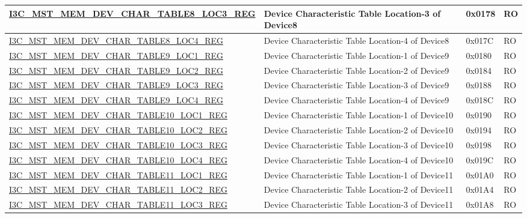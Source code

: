 \begin{longtable}{ | p{8cm} | p{5.5cm} | p{1.3cm} | p{1cm} | }
\hyperref[regdesc:I3CMSTMEMDEVCHARTABLENLOCMREG]{I3C\_MST\_MEM\_DEV\_CHAR\_TABLE8\_LOC3\_REG} & Device Characteristic Table Location-3 of Device8 & 0x0178 & RO \\ \hline
\hyperref[regdesc:I3CMSTMEMDEVCHARTABLENLOCMREG]{I3C\_MST\_MEM\_DEV\_CHAR\_TABLE8\_LOC4\_REG} & Device Characteristic Table Location-4 of Device8 & 0x017C & RO \\ \hline
\hyperref[regdesc:I3CMSTMEMDEVCHARTABLENLOCMREG]{I3C\_MST\_MEM\_DEV\_CHAR\_TABLE9\_LOC1\_REG} & Device Characteristic Table Location-1 of Device9 & 0x0180 & RO \\ \hline
\hyperref[regdesc:I3CMSTMEMDEVCHARTABLENLOCMREG]{I3C\_MST\_MEM\_DEV\_CHAR\_TABLE9\_LOC2\_REG} & Device Characteristic Table Location-2 of Device9 & 0x0184 & RO \\ \hline
\hyperref[regdesc:I3CMSTMEMDEVCHARTABLENLOCMREG]{I3C\_MST\_MEM\_DEV\_CHAR\_TABLE9\_LOC3\_REG} & Device Characteristic Table Location-3 of Device9 & 0x0188 & RO \\ \hline
\hyperref[regdesc:I3CMSTMEMDEVCHARTABLENLOCMREG]{I3C\_MST\_MEM\_DEV\_CHAR\_TABLE9\_LOC4\_REG} & Device Characteristic Table Location-4 of Device9 & 0x018C & RO \\ \hline
\hyperref[regdesc:I3CMSTMEMDEVCHARTABLENLOCMREG]{I3C\_MST\_MEM\_DEV\_CHAR\_TABLE10\_LOC1\_REG} & Device Characteristic Table Location-1 of Device10 & 0x0190 & RO \\ \hline
\hyperref[regdesc:I3CMSTMEMDEVCHARTABLENLOCMREG]{I3C\_MST\_MEM\_DEV\_CHAR\_TABLE10\_LOC2\_REG} & Device Characteristic Table Location-2 of Device10 & 0x0194 & RO \\ \hline
\hyperref[regdesc:I3CMSTMEMDEVCHARTABLENLOCMREG]{I3C\_MST\_MEM\_DEV\_CHAR\_TABLE10\_LOC3\_REG} & Device Characteristic Table Location-3 of Device10 & 0x0198 & RO \\ \hline
\hyperref[regdesc:I3CMSTMEMDEVCHARTABLENLOCMREG]{I3C\_MST\_MEM\_DEV\_CHAR\_TABLE10\_LOC4\_REG} & Device Characteristic Table Location-4 of Device10 & 0x019C & RO \\ \hline
\hyperref[regdesc:I3CMSTMEMDEVCHARTABLENLOCMREG]{I3C\_MST\_MEM\_DEV\_CHAR\_TABLE11\_LOC1\_REG} & Device Characteristic Table Location-1 of Device11 & 0x01A0 & RO \\ \hline
\hyperref[regdesc:I3CMSTMEMDEVCHARTABLENLOCMREG]{I3C\_MST\_MEM\_DEV\_CHAR\_TABLE11\_LOC2\_REG} & Device Characteristic Table Location-2 of Device11 & 0x01A4 & RO \\ \hline
\hyperref[regdesc:I3CMSTMEMDEVCHARTABLENLOCMREG]{I3C\_MST\_MEM\_DEV\_CHAR\_TABLE11\_LOC3\_REG} & Device Characteristic Table Location-3 of Device11 & 0x01A8 & RO \\ \hline

\end{longtable}
